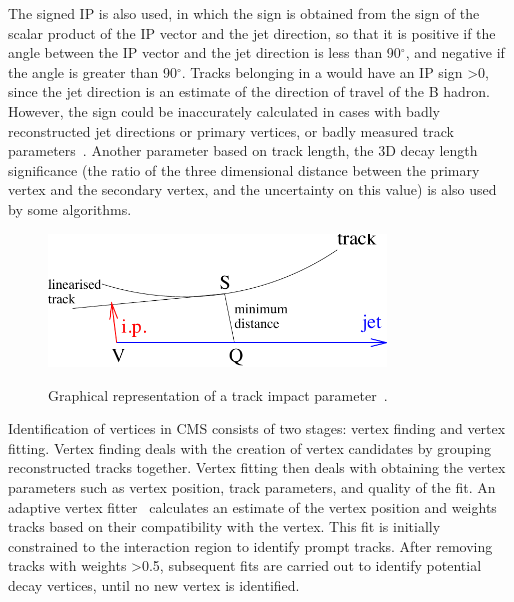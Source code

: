 The signed IP is also used, in which the sign is obtained from the sign of the scalar product of the IP vector
and the jet direction, so that it is positive if the angle between the IP vector and the jet direction is less
than 90$^{\circ}$, and negative if the angle is greater than 90$^{\circ}$. Tracks belonging in a \bjet would
have an IP sign >0, since the jet direction is an estimate of the direction of travel of the B hadron.
However, the sign could be inaccurately calculated in cases with badly reconstructed jet directions or primary
vertices, or badly measured track parameters~\cite{CMS-AN-2005-041}. Another parameter based on track length,
the 3D decay length significance (the ratio of the three dimensional distance between the primary vertex and
the secondary vertex, and the uncertainty on this value) is also used by some \btagging algorithms.

\begin{figure}[hbtp]
   \centering
     \includegraphics[width=0.8\textwidth]{Chapters/06_BTag_Study/Images/impact_parameter}\\
     \caption[Graphical representation of a track impact parameter.]{Graphical representation of a track
     impact parameter~\cite{CMS-PAS-BTV-09-001}.}
     \label{fig:impact_parameter}
\end{figure}

Identification of vertices in CMS consists of two stages: vertex finding and vertex fitting. Vertex finding
deals with the creation of vertex candidates by grouping reconstructed tracks together. Vertex fitting then
deals with obtaining the vertex parameters such as vertex position, track parameters, and quality of the fit.
An adaptive vertex fitter~\cite{0954-3899-34-12-N01} calculates an estimate of the vertex position and weights
tracks based on their compatibility with the vertex. This fit is initially constrained to the interaction
region to identify prompt tracks. After removing tracks with weights >0.5, subsequent fits are carried out to
identify potential decay vertices, until no new vertex is identified.

